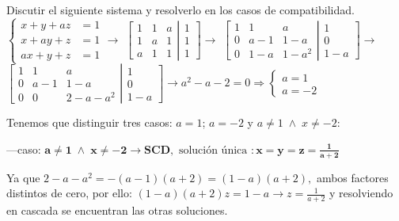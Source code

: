 \begin{ejem} Discutir el siguiente sistema y resolverlo en los casos de compatibilidad.
$\begin{cases} x+y+az&=1\\x+ay+z&=1\\ax+y+z&=1\end{cases} \longrightarrow $
$\left[ \begin{matrix}
 1 & 1 & a \\ 1 & a & 1\\ a & 1 & 1 
 \end{matrix}\right. 
 \left| \begin{matrix}
  1 \\ 1 \\ 1 
 \end{matrix}\right]  \to$
$\left[ \begin{matrix}
 1 & 1 & a \\ 0 & a-1 & 1-a \\ 0 & 1-a & 1-a^2
 \end{matrix}\right. 
 \left| \begin{matrix}
  1 \\ 0 \\ 1-a 
 \end{matrix}\right] \to $	
$\left[ \begin{matrix}
 1 & 1 & a \\ 0 & a-1 & 1-a \\ 0 & 0 & 2-a-a^2
 \end{matrix}\right. 
 \left| \begin{matrix}
  1 \\ 0 \\ 1-a 
 \end{matrix}\right] \to 
 a^2-a-2=0 \Rightarrow \begin{cases} a=1 \\ a=-2\end{cases}$
 
 Tenemos que distinguir tres casos: $a=1$; $a=-2$ y $a\neq 1 \; \wedge \; x\neq -2$:
 
 ---caso: $\boldsymbol{a\neq 1 \; \wedge \; x\neq -2} \to \boldsymbol{SCD}, \text{ solución única }: \boldsymbol{x=y=z=\frac 1 {a+2}}$
 
 \textcolor{gris}{Ya que $2-a-a^2=-(a-1)(a+2)=(1-a)(a+2),$ ambos factores distintos de cero, por ello: $(1-a)(a+2)z=1-a \to z=\frac 1 {a+2}$ y resolviendo en cascada se encuentran las otras soluciones.}
 

\end{ejem}
